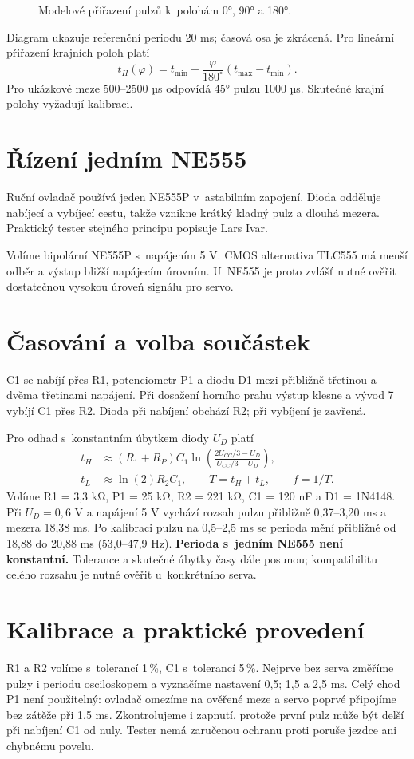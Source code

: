 \begin{figure}[htbp]\centering

\caption{Modelové přiřazení pulzů k~polohám 0°, 90° a 180°.}
\label{fig:pulzy}
\end{figure}

Diagram ukazuje referenční periodu 20 ms; časová osa je zkrácená. Pro lineární přiřazení krajních poloh platí
\begin{equation}\label{eq:map}
 t_H(\varphi)=t_\mathrm{min}+\frac{\varphi}{180^\circ}(t_\mathrm{max}-t_\mathrm{min}).
\end{equation}
Pro ukázkové meze 500--2500 µs odpovídá 45° pulzu 1000 µs. Skutečné krajní polohy vyžadují kalibraci.

\section{Řízení jedním NE555}
Ruční ovladač používá jeden NE555P v~astabilním zapojení. Dioda odděluje nabíjecí a vybíjecí cestu, takže vznikne krátký kladný pulz a dlouhá mezera. Praktický tester stejného principu popisuje Lars Ivar.~\cite{servo555prakticky}

Volíme bipolární NE555P s~napájením 5 V. CMOS alternativa TLC555 má menší odběr a výstup bližší napájecím úrovním. U~NE555 je proto zvlášť nutné ověřit dostatečnou vysokou úroveň signálu pro servo.~\cite{ne555,tlc555}

\section{Časování a volba součástek}
C1 se nabíjí přes R1, potenciometr P1 a diodu D1 mezi přibližně třetinou a dvěma třetinami napájení. Při dosažení horního prahu výstup klesne a vývod 7 vybíjí C1 přes R2. Dioda při nabíjení obchází R2; při vybíjení je zavřená.~\cite{ne555}

Pro odhad s~konstantním úbytkem diody $U_D$ platí
\begin{align}
 t_H&\approx(R_1+R_P)C_1\ln\!\left(\frac{2U_{CC}/3-U_D}{U_{CC}/3-U_D}\right),\\
 t_L&\approx\ln(2)R_2C_1,\qquad T=t_H+t_L,\qquad f=1/T.
\end{align}
Volíme R1 = 3,3 k\si{\ohm}, P1 = 25 k\si{\ohm}, R2 = 221 k\si{\ohm}, C1 = 120 nF a D1 = 1N4148. Při $U_D=0{,}6$ V a napájení 5 V vychází rozsah pulzu přibližně 0,37--3,20 ms a mezera 18,38 ms. Po kalibraci pulzu na 0,5--2,5 ms se perioda mění přibližně od 18,88 do 20,88 ms (53,0--47,9 Hz). \textbf{Perioda s~jedním NE555 není konstantní.} Tolerance a skutečné úbytky časy dále posunou; kompatibilitu celého rozsahu je nutné ověřit u~konkrétního serva.

\section{Kalibrace a praktické provedení}
R1 a R2 volíme s~tolerancí 1\,\%, C1 s~tolerancí 5\,\%. Nejprve bez serva změříme pulzy i periodu osciloskopem a vyznačíme nastavení 0,5; 1,5 a 2,5 ms. Celý chod P1 není použitelný: ovladač omezíme na ověřené meze a servo poprvé připojíme bez zátěže při 1,5 ms. Zkontrolujeme i zapnutí, protože první pulz může být delší při nabíjení C1 od nuly. Tester nemá zaručenou ochranu proti poruše jezdce ani chybnému povelu.
